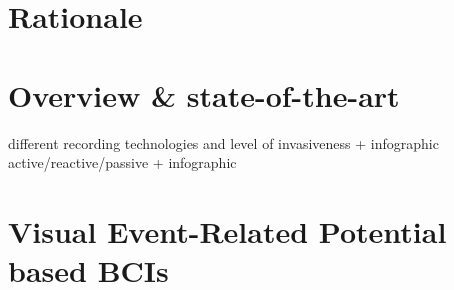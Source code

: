 \section{Rationale}
\section{Overview \& state-of-the-art}
different recording technologies and level of invasiveness + infographic
active/reactive/passive + infographic
\section{Visual Event-Related Potential based BCIs}
